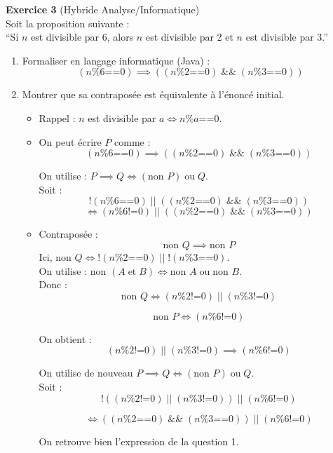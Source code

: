\documentclass[a4paper, 12pt]{article}
\begin{document}
\textbf{Exercice 3} (Hybride Analyse/Informatique) \\
Soit la proposition suivante : \\
``Si \(n\) est divisible par 6, alors \(n\) est divisible par 2 et \(n\) est divisible par 3.'' \\
\begin{enumerate}
    \item Formaliser en langage informatique (Java) :
    \[
    (n \% 6 \texttt{==} 0) \implies ((n \% 2 \texttt{==} 0) \; \mathrel{\&\&} \; (n \% 3 \texttt{==} 0))
    \]

    \item Montrer que sa contraposée est équivalente à l'énoncé initial.
    \begin{itemize}
        \item Rappel : \(n\) est divisible par \(a \iff n \% a \texttt{==} 0\).
        \item On peut écrire \(P\) comme :
        \[
        (n \% 6 \texttt{==} 0) \implies ((n \% 2 \texttt{==} 0) \; \mathrel{\&\&} \; (n \% 3 \texttt{==} 0))
        \]

        On utilise : \(P \implies Q \iff (\text{non } P) \; \text{ou} \; Q\). \\
        Soit :
        \[
        !(n \% 6 \texttt{==} 0) \; \texttt{||} \; ((n \% 2 \texttt{==} 0) \; \mathrel{\&\&} \; (n \% 3 \texttt{==} 0))
        \]
        \[
        \iff (n \% 6 \texttt{!=} 0) \; \texttt{||} \; ((n \% 2 \texttt{==} 0) \; \mathrel{\&\&} \; (n \% 3 \texttt{==} 0))
        \]

        \item Contraposée : 
        \[
        \text{non } Q \implies \text{non } P
        \]
        Ici, \(\text{non } Q \iff !(n \% 2 \texttt{==} 0) \; \texttt{||} \; !(n \% 3 \texttt{==} 0)\). \\
        On utilise : \(\text{non }(A \; \text{et} \; B) \iff \text{non } A \; \text{ou} \; \text{non } B\). \\
        Donc :
        \[
        \text{non } Q \iff (n \% 2 \texttt{!=} 0) \; \texttt{||} \; (n \% 3 \texttt{!=} 0)
        \]

        \[
        \text{non } P \iff (n \% 6 \texttt{!=} 0)
        \]

        On obtient :
        \[
        (n \% 2 \texttt{!=} 0) \; \texttt{||} \; (n \% 3 \texttt{!=} 0) \implies (n \% 6 \texttt{!=} 0)
        \]

        On utilise de nouveau \(P \implies Q \iff (\text{non } P) \; \text{ou} \; Q\). \\
        Soit :
        \[
        !((n \% 2 \texttt{!=} 0) \; \texttt{||} \; (n \% 3 \texttt{!=} 0)) \; \texttt{||} \; (n \% 6 \texttt{!=} 0)
        \]

        \[
        \iff ((n \% 2 \texttt{==} 0) \; \mathrel{\&\&} \; (n \% 3 \texttt{==} 0)) \; \texttt{||} \; (n \% 6 \texttt{!=} 0)
        \]

        On retrouve bien l'expression de la question 1.
    \end{itemize}
\end{enumerate}
\end{document}
